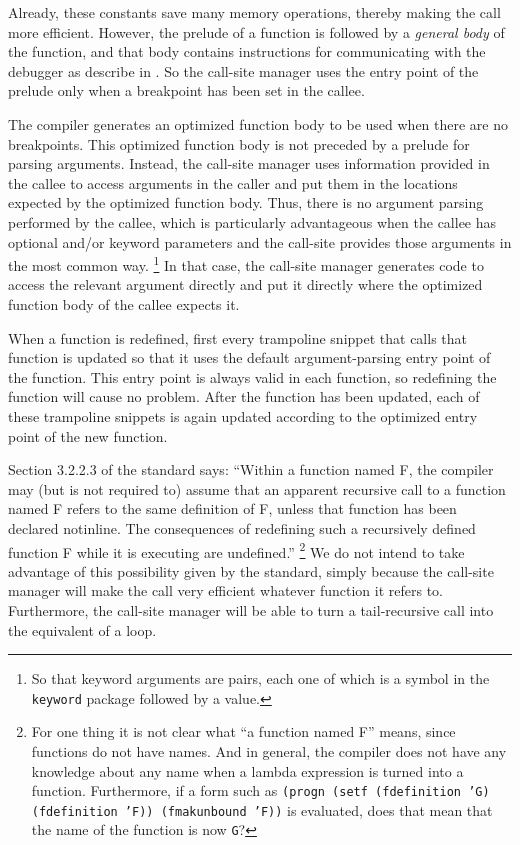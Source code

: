 Already, these constants save many memory operations, thereby making
the call more efficient.  However, the prelude of a function is
followed by a \emph{general body} of the function, and that body
contains instructions for communicating with the debugger as describe
in .  So the call-site manager uses the entry
point of the prelude only when a breakpoint has been set in the
callee.

The compiler generates an optimized function body to be used when
there are no breakpoints.  This optimized function body is not
preceded by a prelude for parsing arguments.  Instead, the call-site
manager uses information provided in the callee to access arguments in
the caller and put them in the locations expected by the optimized
function body.  Thus, there is no argument parsing performed by the
callee, which is particularly advantageous when the callee has
optional and/or keyword parameters and the call-site provides those
arguments in the most common way.%
\footnote{So that keyword arguments are pairs, each one of which is a
  symbol in the \texttt{keyword} package followed by a value.}
In that case, the call-site manager generates code to access the
relevant argument directly and put it directly where the optimized
function body of the callee expects it.

When a function is redefined, first every trampoline snippet that calls
that function is updated so that it uses the default argument-parsing
entry point of the function.  This entry point is always valid in each
function, so redefining the function will cause no problem.  After the
function has been updated, each of these trampoline snippets is again
updated according to the optimized entry point of the new function.

Section 3.2.2.3 of the \commonlisp{} standard says: ``Within a
function named F, the compiler may (but is not required to) assume
that an apparent recursive call to a function named F refers to the
same definition of F, unless that function has been declared
notinline. The consequences of redefining such a recursively defined
function F while it is executing are undefined.''%
\footnote{For one thing it is not clear what ``a function named F''
  means, since functions do not have names.  And in general, the
  compiler does not have any knowledge about any name when a lambda
  expression is turned into a function.  Furthermore, if a form such
  as \texttt{(progn (setf (fdefinition 'G) (fdefinition 'F))
    (fmakunbound 'F))} is evaluated, does that mean that the name of
  the function is now \texttt{G}?}
We do not intend to take advantage of this possibility given by the
standard, simply because the call-site manager will make the call very
efficient whatever function it refers to.  Furthermore, the call-site
manager will be able to turn a tail-recursive call into the equivalent
of a loop.


